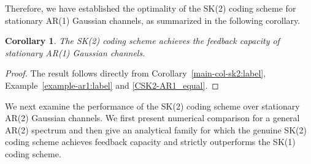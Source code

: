\documentclass[12pt]{article}
\newtheorem{co}[thm]{Corollary}
\begin{document}
Therefore, we have established the optimality of the SK(2) coding scheme for stationary AR(1) Gaussian channels, as summarized in the following corollary.
\begin{co}\label{co-ar1-sk2:label}
The SK(2) coding scheme achieves the feedback capacity of stationary AR(1) Gaussian channels.
\end{co}
\begin{proof}
The result follows directly from Corollary~\ref{main-col-sk2:label}, Example~\ref{example-ar1:label} and \eqref{CSK2-AR1_equal}.
\end{proof}

We next examine the performance of the SK(2) coding scheme over stationary AR(2) Gaussian channels. We first present numerical comparison for a general AR(2) spectrum and then give an analytical family for which the genuine SK(2) coding scheme achieves feedback capacity and strictly outperforms the SK(1) coding scheme.
\end{document}
